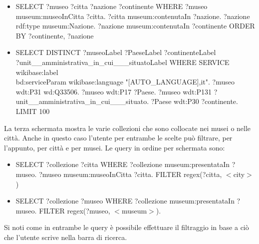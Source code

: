 \documentclass[12pt]{article}
\begin{document}
\begin{itemize}
 \item SELECT ?museo ?citta ?nazione ?continente WHERE {?museo museum:museoInCitta ?citta. ?citta museum:contenutaIn ?nazione. ?nazione rdf:type museum:Nazione. ?nazione museum:contenutaIn ?continente} ORDER BY ?continente, ?nazione
 \item SELECT DISTINCT ?museoLabel ?PaeseLabel ?continenteLabel\\ ?unit\_\_amministrativa\_in\_cui\_\_\_situatoLabel WHERE { SERVICE wikibase:label\\ { bd:serviceParam wikibase:language "[AUTO\_LANGUAGE],it". } ?museo wdt:P31 wd:Q33506. ?museo wdt:P17 ?Paese. ?museo wdt:P131 ?unit\_\_amministrativa\_in\_cui\_\_\_situato. ?Paese wdt:P30 ?continente. } LIMIT 100
\end{itemize} 

La terza schermata mostra le varie collezioni che sono collocate nei musei o nelle città. Anche in questo caso l’utente per entrambe le scelte può filtrare, per l’appunto, per città e per musei.
Le query in ordine per schermata sono:
\begin{itemize}
 \item SELECT ?collezione ?citta WHERE {?collezione museum:presentataIn ?museo. ?museo museum:museoInCitta ?citta. FILTER regex(?citta, $<$city$>$)}
 \item SELECT ?collezione ?museo WHERE { ?collezione museum:presentataIn ?museo.  FILTER regex(?museo, $<$museum$>$).}
\end{itemize} 

Si noti come in entrambe le query è possibile effettuare il filtraggio in base a ciò che l’utente scrive nella barra di ricerca.
\end{document}
